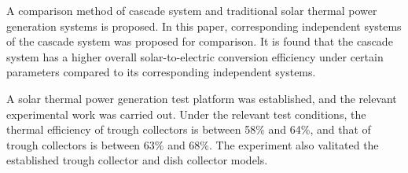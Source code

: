 {A comparison method of cascade system and traditional solar thermal power generation systems is proposed. In this paper, corresponding independent systems of the cascade system was proposed for comparison. It is found that the cascade system has a higher overall solar-to-electric conversion efficiency under certain parameters compared to its corresponding independent systems.

A solar thermal power generation test platform was established, and the relevant experimental work was carried out. Under the relevant test conditions, the thermal efficiency of trough collectors is between 58\% and 64\%, and that of trough collectors is between 63\% and 68\%. The experiment also valitated the established trough collector and dish collector models.

%


}
